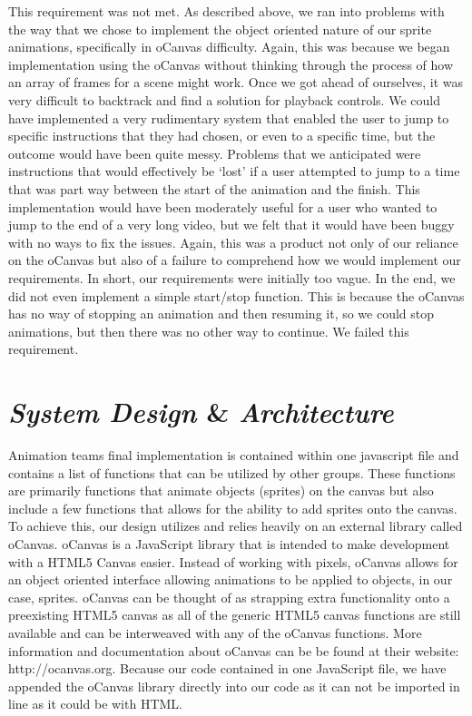 \documentclass[12pt]{article}
\begin{document}
This requirement was not met. As described above, we ran into problems with the way that we chose to implement the object oriented nature of our sprite animations, specifically in oCanvas difficulty. Again, this was because we began implementation using the oCanvas without thinking through the process of how an array of frames for a scene might work. Once we got ahead of ourselves, it was very difficult to backtrack and find a solution for playback controls. We could have implemented a very rudimentary system that enabled the user to jump to specific instructions that they had chosen, or even to a specific time, but the outcome would have been quite messy. Problems that we anticipated were instructions that would effectively be ‘lost’ if a user attempted to jump to a time that was part way between the start of the animation and the finish. This implementation would have been moderately useful for a user who wanted to jump to the end of a very long video, but we felt that it would have been buggy with no ways to fix the issues. Again, this was a product not only of our reliance on the oCanvas but also of a failure to comprehend how we would implement our requirements. In short, our requirements were initially too vague. In the end, we did not even implement a simple start/stop function. This is because the oCanvas has no way of stopping an animation and then resuming it, so we could stop animations, but then there was no other way to continue. We failed this requirement. 

\section{\emph{System Design} \& \emph{Architecture}}
Animation teams final implementation is contained within one javascript file and contains a list of functions that can be utilized by other groups. These functions are primarily functions that animate objects (sprites) on the canvas but also include a few functions that allows for the ability to add sprites onto the canvas. To achieve this, our design utilizes and relies heavily on an external library called oCanvas. oCanvas is a JavaScript library that is intended to make development with a HTML5 Canvas easier. Instead of working with pixels, oCanvas allows for an object oriented interface allowing animations to be applied to objects, in our case, sprites. oCanvas can be thought of as strapping extra functionality onto a preexisting HTML5 canvas as all of the generic HTML5 canvas functions are still available and can be interweaved with any of the oCanvas functions. More information and documentation about oCanvas can be be found at their website: http://ocanvas.org. Because our code contained in one JavaScript file, we have appended the oCanvas library directly into our code as it can not be imported in line as it could be with HTML. \\
\end{document}
